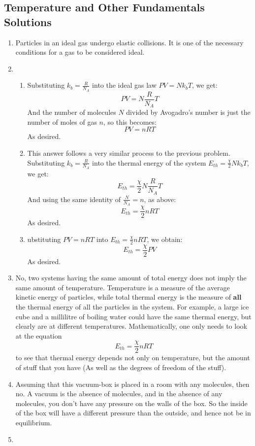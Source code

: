 \subsection{Temperature and Other Fundamentals Solutions}
\begin{enumerate}
    \item Particles in an ideal gas undergo elastic collisions. It is one of the necessary conditions for a gas to be considered ideal.
    \item \begin{enumerate}
        \item Substituting $k_b = \frac{R}{N_A}$ into the ideal gas law $PV = Nk_bT$, we get:
    \[PV = N\frac{R}{N_A}T \]
    And the number of molecules $N$ divided by Avogadro's number is just the number of moles of gas $n$, so this becomes:
    \[PV = nRT \]
    As desired.
        \item This answer follows a very similar process to the previous problem. Substituting $k_b = \frac{R}{N_A}$ into the thermal energy of the system $E_{th} = \frac{\chi}{2}Nk_bT$, we get:
    \[ E_{th} = \frac{\chi}{2}N\frac{R}{N_A}T \]
    And using the same identity of $\frac{N}{N_A} = n$, as above:
    \[ E_{th} = \frac{\chi}{2}nRT \]
    As desired.
        \item ubstituting $PV = nRT$ into $E_{th} = \frac{\chi}{2}nRT$, we obtain:
    \[ E_{th} = \frac{\chi}{2}PV \]
    As desired. 
    \end{enumerate}
    \item No, two systems having the same amount of total energy does not imply the same amount of temperature. Temperature is a measure of the average kinetic energy of particles, while total thermal energy is the measure of \textbf{all} the thermal energy of all the particles in the system. For example, a large ice cube and a millilitre of boiling water could have the same thermal energy, but clearly are at different temperatures. Mathematically, one only needs to look at the equation \[ E_{th} = \frac{\chi}{2}nRT \] to see that thermal energy depends not only on temperature, but the amount of stuff that you have (As well as the degrees of freedom of the stuff). 
    \item Assuming that this vacuum-box is placed in a room with any molecules, then no. A vacuum is the absence of molecules, and in the absence of any molecules, you don't have any pressure on the walls of the box. So the inside of the box will have a different pressure than the outside, and hence not be in equilibrium.
    \item \begin{enumerate}

\end{enumerate}
\end{enumerate}
